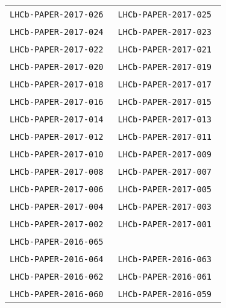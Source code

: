 \begin{center}
\begin{longtable}{ll}
\texttt{LHCb-PAPER-2017-026}~\cite{LHCb-PAPER-2017-026} &
\texttt{LHCb-PAPER-2017-025}~\cite{LHCb-PAPER-2017-025} \\
\texttt{LHCb-PAPER-2017-024}~\cite{LHCb-PAPER-2017-024} &
\texttt{LHCb-PAPER-2017-023}~\cite{LHCb-PAPER-2017-023} \\
\texttt{LHCb-PAPER-2017-022}~\cite{LHCb-PAPER-2017-022} &
\texttt{LHCb-PAPER-2017-021}~\cite{LHCb-PAPER-2017-021} \\
\texttt{LHCb-PAPER-2017-020}~\cite{LHCb-PAPER-2017-020} &
\texttt{LHCb-PAPER-2017-019}~\cite{LHCb-PAPER-2017-019} \\
\texttt{LHCb-PAPER-2017-018}~\cite{LHCb-PAPER-2017-018} &
\texttt{LHCb-PAPER-2017-017}~\cite{LHCb-PAPER-2017-017} \\
\texttt{LHCb-PAPER-2017-016}~\cite{LHCb-PAPER-2017-016} &
\texttt{LHCb-PAPER-2017-015}~\cite{LHCb-PAPER-2017-015} \\
\texttt{LHCb-PAPER-2017-014}~\cite{LHCb-PAPER-2017-014} &
\texttt{LHCb-PAPER-2017-013}~\cite{LHCb-PAPER-2017-013} \\
\texttt{LHCb-PAPER-2017-012}~\cite{LHCb-PAPER-2017-012} &
\texttt{LHCb-PAPER-2017-011}~\cite{LHCb-PAPER-2017-011} \\
\texttt{LHCb-PAPER-2017-010}~\cite{LHCb-PAPER-2017-010} &
\texttt{LHCb-PAPER-2017-009}~\cite{LHCb-PAPER-2017-009} \\
\texttt{LHCb-PAPER-2017-008}~\cite{LHCb-PAPER-2017-008} &
\texttt{LHCb-PAPER-2017-007}~\cite{LHCb-PAPER-2017-007} \\
\texttt{LHCb-PAPER-2017-006}~\cite{LHCb-PAPER-2017-006} &
\texttt{LHCb-PAPER-2017-005}~\cite{LHCb-PAPER-2017-005} \\
\texttt{LHCb-PAPER-2017-004}~\cite{LHCb-PAPER-2017-004} &
\texttt{LHCb-PAPER-2017-003}~\cite{LHCb-PAPER-2017-003} \\
\texttt{LHCb-PAPER-2017-002}~\cite{LHCb-PAPER-2017-002} &
\texttt{LHCb-PAPER-2017-001}~\cite{LHCb-PAPER-2017-001} \\
\hline
\texttt{LHCb-PAPER-2016-065}~\cite{LHCb-PAPER-2016-065} & 
                                                        \\
\texttt{LHCb-PAPER-2016-064}~\cite{LHCb-PAPER-2016-064} & 
\texttt{LHCb-PAPER-2016-063}~\cite{LHCb-PAPER-2016-063} \\
\texttt{LHCb-PAPER-2016-062}~\cite{LHCb-PAPER-2016-062} & 
\texttt{LHCb-PAPER-2016-061}~\cite{LHCb-PAPER-2016-061} \\
\texttt{LHCb-PAPER-2016-060}~\cite{LHCb-PAPER-2016-060} & 
\texttt{LHCb-PAPER-2016-059}~\cite{LHCb-PAPER-2016-059} \\

\end{longtable}
\end{center}
